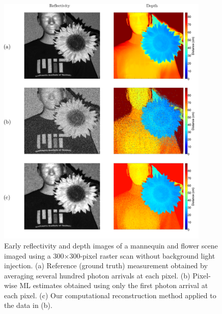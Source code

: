 \begin{figure}[h!]
\centerline{\includegraphics[width=0.9\textwidth]{figure-first-manflower.pdf}}
\caption{Early reflectivity and depth images of a mannequin and flower scene imaged using a 300$\times$300-pixel raster scan without background light injection. (a) Reference (ground truth) measurement obtained by averaging several hundred photon arrivals at each pixel. (b) Pixel-wise ML estimates obtained using only the first photon arrival at each pixel. (c) Our computational reconstruction method applied to the data in (b).}
\label{figure:first-manflower}
\end{figure}

